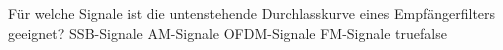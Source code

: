     {Für welche Signale ist die untenstehende Durchlasskurve eines Empfängerfilters geeignet?}
    {SSB-Signale}
    {AM-Signale}
    {OFDM-Signale}
    {FM-Signale}
    {true}{false}